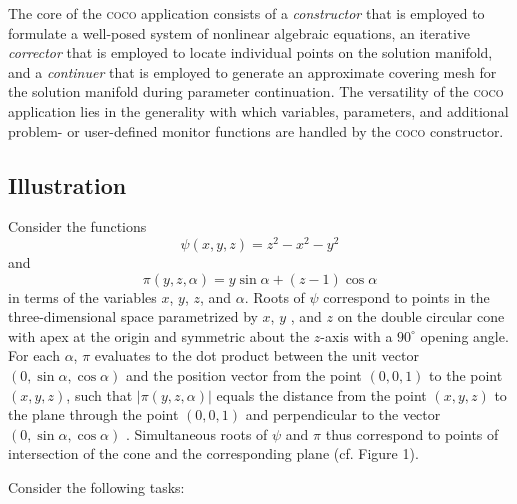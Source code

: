 \documentclass{article}
\begin{document}
The core of the \textsc{coco} application consists of a \emph{constructor}
that is employed to formulate a well-posed system of nonlinear algebraic
equations, an iterative \emph{corrector} that is employed to locate
individual points on the solution manifold, and a \emph{continuer} that is
employed to generate an approximate covering mesh for the solution manifold
during parameter continuation. The versatility of the \textsc{coco}
application lies in the generality with which variables, parameters, and
additional problem- or user-defined monitor functions are handled by the 
\textsc{coco} constructor.

\subsection{Illustration}

Consider the functions%
\[
\psi \left( x,y,z\right) =z^{2}-x^{2}-y^{2}
\]%
and%
\[
\pi \left( y,z,\alpha \right) =y\sin \alpha +\left( z-1\right) \cos \alpha 
\]%
in terms of the variables $x$, $y$, $z$, and $\alpha $. Roots of $\psi $
correspond to points in the three-dimensional space parametrized by $x$, $y$%
, and $z$ on the double circular cone with apex at the origin and symmetric
about the $z$-axis with a $90^{\circ }$ opening angle. For each $\alpha $, $%
\pi $ evaluates to the dot product between the unit vector $\left( 0,\sin
\alpha ,\cos \alpha \right) $ and the position vector from the point $\left(
0,0,1\right) $ to the point $\left( x,y,z\right) $, such that $\left| \pi
\left( y,z,\alpha \right) \right| $ equals the distance from the point $%
\left( x,y,z\right) $ to the plane through the point $\left( 0,0,1\right) $
and perpendicular to the vector $\left( 0,\sin \alpha ,\cos \alpha \right) $%
. Simultaneous roots of $\psi $ and $\pi $ thus correspond to points of
intersection of the cone and the corresponding plane (cf. Figure 1).

Consider the following tasks:
\end{document}
